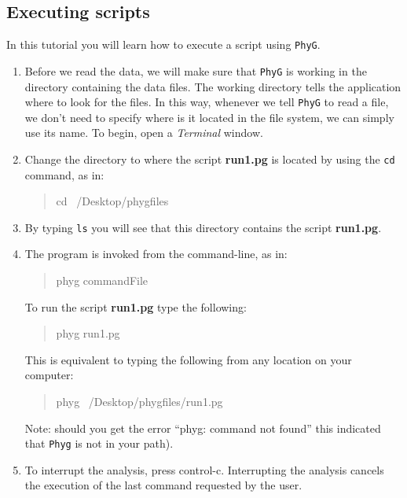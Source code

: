 \documentclass[11pt]{article}
\newcommand{\phyg}{\texttt{PhyG} }
\begin{document}
\subsection{Executing scripts}
\label{subsec:Execution}

In this tutorial you will learn how to execute a script using \texttt{PhyG}. 

\begin{enumerate}

\item Before we read the data, we will make sure that \phyg is working in the directory 
containing the data files. The working directory tells the application where to look 
for the files. In this way, whenever we tell \phyg to read a file, we don't need to 
specify where is it located in the file system, we can simply use its name. To 
begin, open a \textit{Terminal} window.
        
\item Change the directory to where the script \textbf{run1.pg} is located by using the 
\texttt{cd} command, as in:
		
	\begin{quote}
	cd ~/Desktop/phygfiles
	\end{quote}
   
\item By typing \texttt{ls} you will see that this directory contains the script 
\textbf{run1.pg}.

\item The program is invoked from the command-line, as in:
		
	\begin{quote}
	phyg commandFile
	\end{quote}
	
To run the script \textbf{run1.pg} type the following:
		
	\begin{quote}
  	phyg run1.pg
	\end{quote}
	
This is equivalent to typing the following from any location on your computer:
	
	\begin{quote}
  	phyg ~/Desktop/phygfiles/run1.pg
	\end{quote}

Note: should you get the error ``phyg: command not found'' this indicated that 
\texttt{Phyg} is not in your path). 
	
\item To interrupt the analysis, press control-c. Interrupting the analysis cancels 
the execution of the last command requested by the user. 

\end{enumerate}
\end{document}
